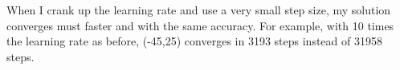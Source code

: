 \begin{fullwidth}
\noindent {}

\noindent {}

When I crank up the learning rate and use a very small step size, my solution converges must faster and with the same accuracy. For example, with 10 times the learning rate as before, (-45,25) converges in 3193 steps instead of 31958 steps.


\end{fullwidth}
